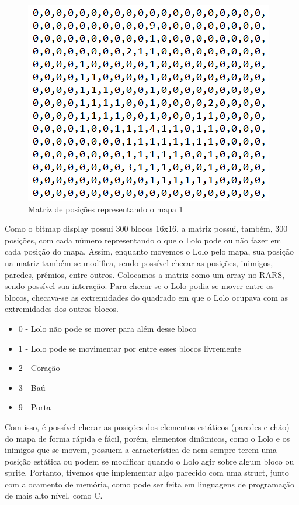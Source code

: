\documentclass[10pt, conference, compsocconf]{IEEEtran}
\begin{document}
\begin{figure}[htb]
  \begin{center}
   \includegraphics[width=0.9\linewidth]{./Figures/image_7.png}
  \end{center}
  \caption{Matriz de posições representando o mapa 1}
  \label{fig:01}
\end{figure}

Como o bitmap display possui 300 blocos 16x16, a matriz possui, também, 300
posições, com cada número representando o que o Lolo pode ou não fazer em cada
posição do mapa. Assim, enquanto movemos o Lolo pelo mapa, sua posição na matriz
também se modifica, sendo possível checar as posições, inimigos, paredes,
prêmios, entre outros. Colocamos a matriz como um array no RARS, sendo possível
sua interação. Para checar se o Lolo podia se mover entre os blocos, checava-se
as extremidades do quadrado em que o Lolo ocupava com as extremidades dos outros
blocos.


\begin{itemize}
    \item 0 - Lolo não pode se mover para além desse bloco
    \item 1 - Lolo pode se movimentar por entre esses blocos livremente
    \item 2 - Coração
    \item 3 - Baú
    \item 9 - Porta
\end{itemize}

Com isso, é possível checar as posições dos elementos estáticos (paredes e chão)
do mapa de forma rápida e fácil, porém, elementos dinâmicos, como o Lolo e os
inimigos que se movem, possuem a característica de nem sempre terem uma posição
estática ou podem se modificar quando o Lolo agir sobre algum bloco ou sprite.
Portanto, tivemos que implementar algo parecido com uma struct, junto com
alocamento de memória, como pode ser feita em linguagens de programação de mais
alto nível, como C.
\end{document}
